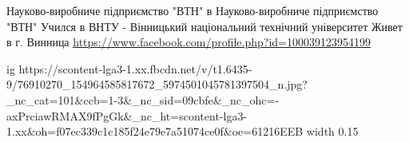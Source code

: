 
 
 
 
 

Науково-виробниче підприємство "ВТН" в Науково-виробниче підприємство "ВТН"
Учился в ВНТУ - Вінницький національний технічний університет
Живет в г. Винница
\url{https://www.facebook.com/profile.php?id=100039123954199}\par
\ifcmt
  ig https://scontent-lga3-1.xx.fbcdn.net/v/t1.6435-9/76910270_154964585817672_5974501045781397504_n.jpg?_nc_cat=101&ccb=1-3&_nc_sid=09cbfe&_nc_ohc=-axPrciawRMAX9fPgGk&_nc_ht=scontent-lga3-1.xx&oh=f07ec339c1c185f24e79e7a51074ce0f&oe=61216EEB
  width 0.15
\fi
